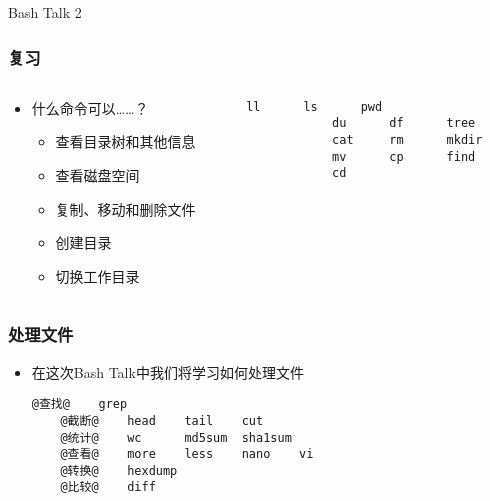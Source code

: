 


\begin{CJK}{UTF8}{gbsn}

\PreFirstFrame
\begin{frame} [fragile]
	\centerline{\fontsize{42}{42}\selectfont Bash Talk 2}
\end{frame}
\PostFirstFrame

\begin{frame} [fragile]
	\frametitle{复习}
	\linespread{1.5}
	\begin{columns}[T]
		\begin{column}[T]{.5\textwidth}
			\begin{itemize}
			\item 什么命令可以……？
				\begin{itemize}
				\item 查看目录树和其他信息
				\item 查看磁盘空间
				\item 复制、移动和删除文件
				\item 创建目录
				\item 切换工作目录
				\end{itemize}
			\end{itemize}
		\end{column}
		\begin{column}[T]{.5\textwidth}
			\begin{lstlisting}[style=bashstyle, gobble=12, texcl]
			ll		ls		pwd
			du		df		tree
			cat		rm		mkdir
			mv		cp		find
			cd
			\end{lstlisting}
		\end{column}
	\end{columns}
\end{frame}

\begin{frame} [fragile]
	\frametitle{处理文件}
	\linespread{1.5}
	\begin{itemize}
	\item 在这次Bash Talk中我们将学习如何处理文件
	\begin{lstlisting}[style=bashstyle, gobble=4, texcl, escapechar=@]
	@查找@	grep
	@截断@	head	tail	cut
	@统计@	wc		md5sum	sha1sum
	@查看@	more	less	nano	vi
	@转换@	hexdump
	@比较@	diff
	\end{lstlisting}
	\end{itemize}
\end{frame}


\end{CJK}
